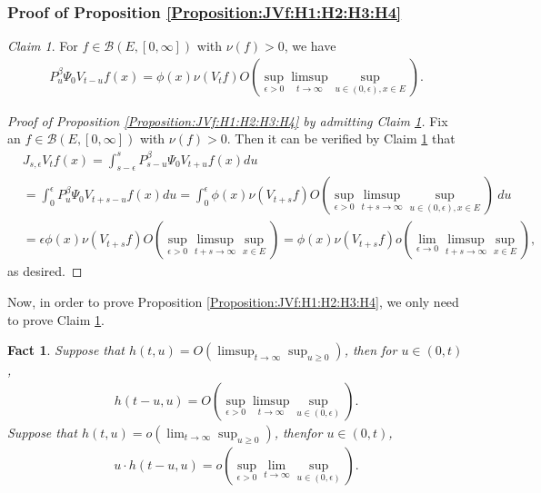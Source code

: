 \documentclass[12pt,a4paper]{amsart}
\numberwithin{equation}{section}
\theoremstyle{plain}
\newtheorem{fact}[thm]{Fact}
\theoremstyle{definition}
\theoremstyle{remark}
\newtheorem{claim}[thm]{Claim}
\begin{document}
\subsubsection{Proof of Proposition \ref{Proposition:JVf:H1:H2:H3:H4}}
\label{subsubsec:PJVf}
\begin{claim} \label{Claim:PPV:H1:H2:H3:H4}
For $f \in \mathcal B(E,[0,\infty])$ with $\nu(f)>0$, we have
\begin{align}
 P_u^\beta \Psi_0 V_{t-u} f(x)
 = \phi(x)\nu(V_tf) O(\sup_{\epsilon > 0} \limsup_{t\to \infty} \sup_{u \in (0,\epsilon), x\in E}).
 \end{align}
\end{claim}
\begin{proof}[{Proof of Proposition \ref{Proposition:JVf:H1:H2:H3:H4} by admitting Claim \ref{Claim:PPV:H1:H2:H3:H4}}]
Fix an $f\in \mathcal B(E,[0,\infty])$ with $\nu(f)>0$.
Then it can be verified by Claim \ref{Claim:PPV:H1:H2:H3:H4} that
\begin{align}
 &J_{s,\epsilon}V_tf(x)
 = \int_{s-\epsilon}^s P_{s-u}^\beta \Psi_0 V_{t+u} f(x)du
 \\&= \int_0^\epsilon P_u^\beta \Psi_0 V_{t+s - u}f(x) du
 = \int_0^\epsilon \phi(x) \nu(V_{t+s}f) O(\sup_{\epsilon > 0} \limsup_{t+s\to \infty} \sup_{u \in (0,\epsilon), x\in E})~du
 \\&= \epsilon \phi(x)\nu(V_{t+s}f) O(\sup_{\epsilon > 0} \limsup_{t+s \to \infty} \sup_{x\in E})
 = \phi(x)\nu(V_{t+s}f)o(\lim_{\epsilon \to 0} \limsup_{t+s \to \infty} \sup_{x\in E}),
 \end{align}
as desired.
\end{proof}
Now, in order to prove Proposition \ref{Proposition:JVf:H1:H2:H3:H4}, we only need to prove Claim \ref{Claim:PPV:H1:H2:H3:H4}.
\begin{fact} \label{Fact:TO!}
Suppose that $h(t,u) = O(\limsup_{t\to \infty} \sup_{u\geq 0})$, then for $u\in (0, t)$,
\begin{align}
 h(t-u, u)
 = O(\sup_{\epsilon > 0} \limsup_{t\to \infty} \sup_{u \in (0,\epsilon)}).
 \end{align}
Suppose that $h(t,u) = o(\lim_{t\to \infty} \sup_{u \geq 0})$, thenfor $u\in (0, t)$,
\begin{align}
 u\cdot h(t-u,u)
 = o(\sup_{\epsilon > 0} \lim_{t\to \infty} \sup_{u \in (0,\epsilon)}).
 \end{align}
\end{fact}
\end{document}
